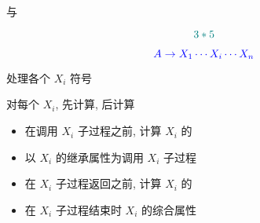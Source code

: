 \begin{frame}{}
  \begin{center}
     与 

    \vspace{0.30cm}
    \vspace{-0.20cm}
    \[
      \textcolor{teal}{3 \ast 5}
    \]

    \vspace{-0.50cm}
    \[
      \textcolor{blue}{A \to X_{1} \cdots X_{i} \cdots X_{n}}
    \]

     处理各个 $X_{i}$ 符号

    \vspace{0.10cm}
    对每个 $X_{i}$, 先计算, 后计算
  \end{center}
\end{frame}

\begin{frame}{}
  \begin{center}

    \vspace{0.80cm}
    \begin{itemize}
      \centering
      \setlength{\itemsep}{15pt}
      \item 在调用 $X_{i}$ 子过程之前, 计算 $X_{i}$ 的
      \item 以 $X_{i}$ 的继承属性为调用 $X_{i}$ 子过程
      \vspace{10pt}
      \item 在 $X_{i}$ 子过程返回之前, 计算 $X_{i}$ 的
      \item 在 $X_{i}$ 子过程结束时 $X_{i}$ 的综合属性
    \end{itemize}
  \end{center}
\end{frame}



